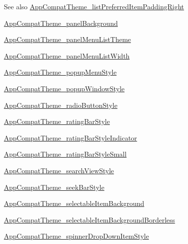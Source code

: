 \begin{DoxySeeAlso}{See also}
\hyperlink{classproject4_1_1xaria_1_1R_1_1styleable_a740af6d810089e93e6259d049551e18b}{App\+Compat\+Theme\+\_\+list\+Preferred\+Item\+Padding\+Right} 

\hyperlink{classproject4_1_1xaria_1_1R_1_1styleable_ac551be8c36d995c3e33f28f517d7a324}{App\+Compat\+Theme\+\_\+panel\+Background} 

\hyperlink{classproject4_1_1xaria_1_1R_1_1styleable_a1d930daeea752accaa963f15053cb96c}{App\+Compat\+Theme\+\_\+panel\+Menu\+List\+Theme} 

\hyperlink{classproject4_1_1xaria_1_1R_1_1styleable_a43aec01657d9d84df72132aef49c3979}{App\+Compat\+Theme\+\_\+panel\+Menu\+List\+Width} 

\hyperlink{classproject4_1_1xaria_1_1R_1_1styleable_abd4023d3d2a91ab681c1225563f99a45}{App\+Compat\+Theme\+\_\+popup\+Menu\+Style} 

\hyperlink{classproject4_1_1xaria_1_1R_1_1styleable_af65cde560faf376a1a1d60f7eb858a6d}{App\+Compat\+Theme\+\_\+popup\+Window\+Style} 

\hyperlink{classproject4_1_1xaria_1_1R_1_1styleable_a76cf668ccbb7d7b487042d61c9b4a2e1}{App\+Compat\+Theme\+\_\+radio\+Button\+Style} 

\hyperlink{classproject4_1_1xaria_1_1R_1_1styleable_a89d18e267c360b44756771f540ab88f2}{App\+Compat\+Theme\+\_\+rating\+Bar\+Style} 

\hyperlink{classproject4_1_1xaria_1_1R_1_1styleable_af3937cdc8aa3bd4b266711ff72f3eebb}{App\+Compat\+Theme\+\_\+rating\+Bar\+Style\+Indicator} 

\hyperlink{classproject4_1_1xaria_1_1R_1_1styleable_aaf8de5a19d0b128396fe6e219e2988aa}{App\+Compat\+Theme\+\_\+rating\+Bar\+Style\+Small} 

\hyperlink{classproject4_1_1xaria_1_1R_1_1styleable_ad924c1e6f178ccfee69b445c201c2e63}{App\+Compat\+Theme\+\_\+search\+View\+Style} 

\hyperlink{classproject4_1_1xaria_1_1R_1_1styleable_a443f701138b45301d896b25f88f24834}{App\+Compat\+Theme\+\_\+seek\+Bar\+Style} 

\hyperlink{classproject4_1_1xaria_1_1R_1_1styleable_ad619b68b2480af24fe678380486bcf3e}{App\+Compat\+Theme\+\_\+selectable\+Item\+Background} 

\hyperlink{classproject4_1_1xaria_1_1R_1_1styleable_ab2466f3fbbecad455aa1db2f009363f0}{App\+Compat\+Theme\+\_\+selectable\+Item\+Background\+Borderless} 

\hyperlink{classproject4_1_1xaria_1_1R_1_1styleable_afdbe9190461391839d559af54a7397ed}{App\+Compat\+Theme\+\_\+spinner\+Drop\+Down\+Item\+Style} 


\end{DoxySeeAlso}
